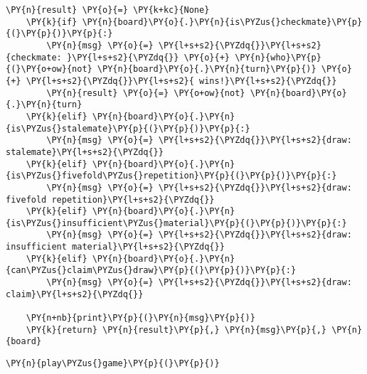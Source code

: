 \begin{tcolorbox}[fontupper=\linespread{.66}\selectfont, breakable, size=fbox, boxrule=1pt, pad at break*=1mm,colback=cellbackground, colframe=cellborder]
\begin{Verbatim}[commandchars=\\\{\}]
    \PY{n}{result} \PY{o}{=} \PY{k+kc}{None}
    \PY{k}{if} \PY{n}{board}\PY{o}{.}\PY{n}{is\PYZus{}checkmate}\PY{p}{(}\PY{p}{)}\PY{p}{:}
        \PY{n}{msg} \PY{o}{=} \PY{l+s+s2}{\PYZdq{}}\PY{l+s+s2}{checkmate: }\PY{l+s+s2}{\PYZdq{}} \PY{o}{+} \PY{n}{who}\PY{p}{(}\PY{o+ow}{not} \PY{n}{board}\PY{o}{.}\PY{n}{turn}\PY{p}{)} \PY{o}{+} \PY{l+s+s2}{\PYZdq{}}\PY{l+s+s2}{ wins!}\PY{l+s+s2}{\PYZdq{}}
        \PY{n}{result} \PY{o}{=} \PY{o+ow}{not} \PY{n}{board}\PY{o}{.}\PY{n}{turn}
    \PY{k}{elif} \PY{n}{board}\PY{o}{.}\PY{n}{is\PYZus{}stalemate}\PY{p}{(}\PY{p}{)}\PY{p}{:}
        \PY{n}{msg} \PY{o}{=} \PY{l+s+s2}{\PYZdq{}}\PY{l+s+s2}{draw: stalemate}\PY{l+s+s2}{\PYZdq{}}
    \PY{k}{elif} \PY{n}{board}\PY{o}{.}\PY{n}{is\PYZus{}fivefold\PYZus{}repetition}\PY{p}{(}\PY{p}{)}\PY{p}{:}
        \PY{n}{msg} \PY{o}{=} \PY{l+s+s2}{\PYZdq{}}\PY{l+s+s2}{draw: fivefold repetition}\PY{l+s+s2}{\PYZdq{}}
    \PY{k}{elif} \PY{n}{board}\PY{o}{.}\PY{n}{is\PYZus{}insufficient\PYZus{}material}\PY{p}{(}\PY{p}{)}\PY{p}{:}
        \PY{n}{msg} \PY{o}{=} \PY{l+s+s2}{\PYZdq{}}\PY{l+s+s2}{draw: insufficient material}\PY{l+s+s2}{\PYZdq{}}
    \PY{k}{elif} \PY{n}{board}\PY{o}{.}\PY{n}{can\PYZus{}claim\PYZus{}draw}\PY{p}{(}\PY{p}{)}\PY{p}{:}
        \PY{n}{msg} \PY{o}{=} \PY{l+s+s2}{\PYZdq{}}\PY{l+s+s2}{draw: claim}\PY{l+s+s2}{\PYZdq{}}
    
    \PY{n+nb}{print}\PY{p}{(}\PY{n}{msg}\PY{p}{)}
    \PY{k}{return} \PY{n}{result}\PY{p}{,} \PY{n}{msg}\PY{p}{,} \PY{n}{board}
\end{Verbatim}
\end{tcolorbox}

\bigskip

    \begin{tcolorbox}[fontupper=\linespread{.66}\selectfont, breakable, size=fbox, boxrule=1pt, pad at break*=1mm,colback=cellbackground, colframe=cellborder]
\begin{Verbatim}[commandchars=\\\{\}]
\PY{n}{play\PYZus{}game}\PY{p}{(}\PY{p}{)}
\end{Verbatim}
\end{tcolorbox}
